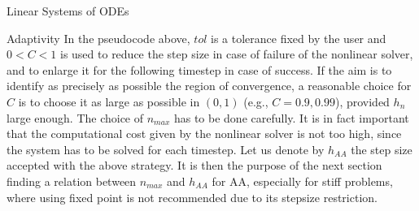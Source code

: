 \documentclass{article}
\begin{document}
\begin{section}{Linear Systems of ODEs}
\begin{subsection}{Adaptivity}
\noindent In the pseudocode above, $tol$ is a tolerance fixed by the user and $0 < C < 1$ is used to reduce the step size in case of failure of the nonlinear solver, and to enlarge it for the following timestep in case of success. If the aim is to identify as precisely as possible the region of convergence, a reasonable choice for $C$ is to choose it as large as possible in $(0,1)$ (e.g., $C=0.9,0.99$), provided $h_n$ large enough. The choice of $n_{max}$ has to be done carefully. It is in fact important that the computational cost given by the nonlinear solver is not too high, since the system has to be solved for each timestep. Let us denote by $h_{AA}$ the step size accepted with the above strategy. It is then the purpose of the next section finding a relation between $n_{max}$ and $h_{AA}$ for AA, especially for stiff problems, where using fixed point is not recommended due to its stepsize restriction.
\end{subsection}


\end{section}
\end{document}
